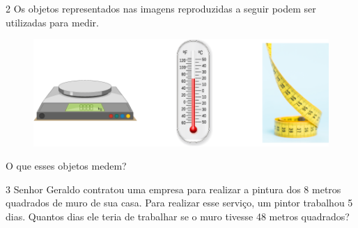 \num{2} Os objetos representados nas imagens reproduzidas a seguir podem ser utilizadas para medir.

\begin{figure}[htpb!]
\centering
\includegraphics[width=\textwidth]{media/image70.png}
\end{figure}

O que esses objetos medem?

\num{3} Senhor Geraldo contratou uma empresa para realizar a pintura dos 8
metros quadrados de muro de sua casa. Para realizar esse serviço, um pintor
trabalhou 5 dias. Quantos dias ele teria de trabalhar se o muro tivesse
48 metros quadrados?

